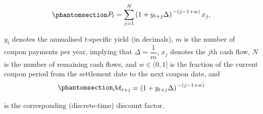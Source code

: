\documentclass[
  letterpaper,
  DIV=11,
  numbers=noendperiod]{scrreprt}
\begin{document}
\begin{tcolorbox}[enhanced jigsaw, arc=.35mm, bottomrule=.15mm, bottomtitle=1mm, breakable, colback=white, colbacktitle=quarto-callout-note-color!10!white, colframe=quarto-callout-note-color-frame, coltitle=black, left=2mm, leftrule=.75mm, opacityback=0, opacitybacktitle=0.6, rightrule=.15mm, title=\textcolor{quarto-callout-note-color}{\faInfo}\hspace{0.5em}{Note}, titlerule=0mm, toprule=.15mm, toptitle=1mm]

\begin{equation}\protect\phantomsection\label{eq-gen-0027}{  
\begin{align}
P_t = \sum_{j=1}^{N} \left(1 + y_{t+j}\Delta \right)^{\,-(j-1+w)} x_j,
\end{align}
}\end{equation}

\(y_t\) denotes the annualised \(t\)-specific yield (in decimals), \(m\)
is the number of coupon payments per year, implying that
\(\Delta =\dfrac{1}{m}\), \(x_j\) denotes the \(j\)th cash flow, \(N\)
is the number of remaining cash flows, and \(w \in (0,1]\) is the
fraction of the current coupon period from the settlement date to the
next coupon date, and
\begin{equation}\protect\phantomsection\label{eq-gen-0028}{  
\begin{align}
 \mathcal{M}_{t+j} = \left(1 + y_{t+j}\Delta \right)^{\,-(j-1+w)}
\end{align}
}\end{equation}

is the corresponding (discrete-time) discount factor.

\end{tcolorbox}
\end{document}
